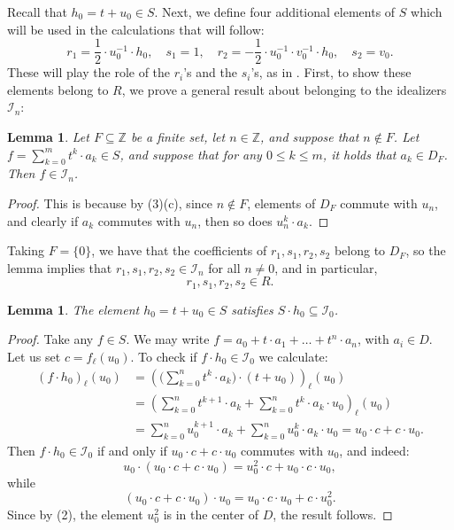 \documentclass{amsart}
\newtheorem{lem}[equation]{Lemma}
\theoremstyle{definition}
\numberwithin{equation}{section}
\begin{document}
Recall that $h_0 = t + u_0 \in S$.
Next, we define four additional elements of $S$ which will be used in the calculations that will follow:
\begin{equation}\label{eqn:rs-elements}
r_1 = \frac{1}{2}\cdot u_0^{-1}\cdot h_0, \quad s_1 = 1, \quad r_2 = -\frac{1}{2}\cdot u_0^{-1}\cdot v_0^{-1}\cdot h_0, \quad s_2 = v_0.
\end{equation}
These will play the role of the $r_i$'s and the $s_i$'s, as in . First, to show these elements belong to $R$,
we prove a general result about belonging to the idealizers $\mathcal{I}_n$:
\begin{lem}\label{lem:coeffBelong}
Let $F \subseteq \mathbb{Z}$ be a finite set,
let $n \in \mathbb{Z}$, and suppose that $n \notin F$.
Let $f = \sum_{k=0}^m t^k\cdot a_k \in S$,
and suppose that for any $0\le k \le m$, 
it holds that $a_k \in D_F$.
Then $f \in \mathcal{I}_n$.
\end{lem}
\begin{proof}
This is because by (3)(c),
since $n\notin F$, elements of $D_F$ commute with $u_n$,
and clearly if $a_k$ commutes with $u_n$, 
then so does $u_n^k\cdot a_k$.
\end{proof}

Taking $F = \{0\}$, we have that the coefficients of $r_1,s_1,r_2,s_2$ belong to $D_F$, so the lemma implies that $r_1,s_1,r_2,s_2 \in \mathcal{I}_n$ for all $n \ne 0$,
and in particular, 
\begin{equation}\label{eqn:risiinR}
r_1,s_1,r_2,s_2 \in R.
\end{equation}

\begin{lem}\label{lem:Sh_0}
The element $h_0 = t + u_0 \in S$ satisfies $S\cdot h_0 \subseteq \mathcal{I}_0$.
\end{lem}
\begin{proof}
Take any $f \in S$.
We may write $f = a_0 + t\cdot a_1 + \dots + t^n \cdot a_n$, with $a_i \in D$.
Let us set $c = f_{\ell}(u_0)$.
To check if $f\cdot h_0 \in \mathcal{I}_0$ we calculate:
\begin{align*}
(f\cdot h_0)_{\ell}(u_0) &= 
\left(\bigl(\sum_{k=0}^n t^k\cdot a_k\bigr)\cdot (t + u_0)\right)_{\ell}(u_0) \\ &= 
\left( \sum_{k=0}^n t^{k+1}\cdot a_k + \sum_{k=0}^n t^k\cdot a_k \cdot u_0 \right)_{\ell}(u_0) \\ &= 
\sum_{k=0}^n u_0^{k+1}\cdot a_k + \sum_{k=0}^n u_0^k\cdot a_k \cdot u_0 = u_0\cdot c + c\cdot u_0.
\end{align*}
Then $f\cdot h_0 \in \mathcal{I}_0$ if and only if $u_0 \cdot c + c\cdot u_0$ commutes with $u_0$, and indeed:
\[
u_0 \cdot (u_0 \cdot c + c\cdot u_0) = u_0^2 \cdot c + u_0\cdot c \cdot u_0,
\]
while 
\[
(u_0 \cdot c + c\cdot u_0) \cdot u_0 = u_0\cdot c \cdot u_0 + c\cdot u_0^2.
\]
Since by (2), the element $u_0^2$ is in the center of $D$, the result follows.
\end{proof}
\end{document}
